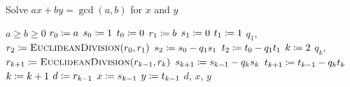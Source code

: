 \begin{algorithm}[t]
\caption[Extended Euclidean Algorithm]{Solve $ax + by = \gcd(a,b)$ for $x$ and $y$}
\label{alg:extended_euclidean_alg}
\begin{algorithmic}[1]
\Require $a\ge b\ge 0$
    \State $r_{0} \coloneqq{} a$
    \State $s_{0} \coloneqq{} 1$
    \State $t_{0} \coloneqq{} 0$
    \State $r_{1} \coloneqq{} b$
    \State $s_{1} \coloneqq{} 0$
    \State $t_{1} \coloneqq{} 1$
    \State $q_{1}$, $r_{2} \coloneqq{} \textsc{EuclideanDivision}(r_{0},r_{1})$
    \State $s_{2} \coloneqq{} s_{0} - q_{1}s_{1}$
    \State $t_{2} \coloneqq{} t_{0} - q_{1}t_{1}$
    \State $k \coloneqq{} 2$
        \State $q_{k}$, $r_{k+1} \coloneqq{}
            \textsc{EuclideanDivision}(r_{k-1},r_{k})$
        \State $s_{k+1} \coloneqq{} s_{k-1} - q_{k}s_{k}$
        \State $t_{k+1} \coloneqq{} t_{k-1} - q_{k}t_{k}$
        \State $k \coloneqq{} k+1$
    \EndWhile
    \State $d \coloneqq{} r_{k-1}$
    \State $x \coloneqq{} s_{k-1}$
    \State $y \coloneqq{} t_{k-1}$
    \State \Return $d$, $x$, $y$
\EndProcedure
\end{algorithmic}
\end{algorithm}
